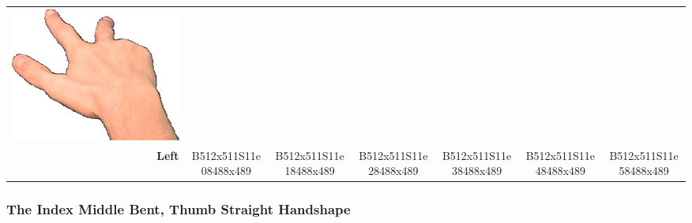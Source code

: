 \documentclass{article}
\begin{document}
\begin{center}
\begin{tabular}{r*{6}{c}}
\includegraphics[scale=0.1]{images/03-01-6.jpg}\\
\textbf{Left}&
B512x511S11e08488x489&
B512x511S11e18488x489&
B512x511S11e28488x489&
B512x511S11e38488x489&
B512x511S11e48488x489&
B512x511S11e58488x489\\
\end{tabular}
\end{center}

\subsubsection{The Index Middle Bent, Thumb Straight Handshape}
\end{document}
